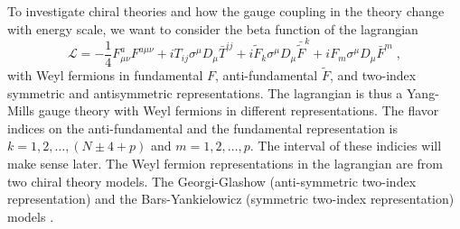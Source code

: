 To investigate chiral theories and how the gauge coupling in the theory change with energy scale, we want to consider the beta function of the lagrangian 
\begin{equation}
    \mathcal{L}=-\frac{1}{4} F^a_{\mu\nu}F^{a\mu\nu} + iT_{ij}\sigma^\mu D_\mu \bar T^{ij} + i\tilde{F}_k\sigma^\mu D_\mu \bar{\tilde{F}}^k+iF_m \sigma^\mu D_\mu \bar{F}^m\;, \label{eq:lagrangian YM Weyl}
\end{equation}
with Weyl fermions in fundamental $F$, anti-fundamental $\tilde{F}$, and two-index symmetric and antisymmetric representations. The lagrangian is thus a Yang-Mills gauge theory with Weyl fermions in different representations. The flavor indices on the anti-fundamental and the fundamental representation is $k=1,2,\ldots,(N\pm 4+p)$ and $m=1,2,\ldots,p$. The interval of these indicies will make sense later. The Weyl fermion representations in the lagrangian are from two chiral theory models. The Georgi-Glashow (anti-symmetric two-index representation) and the Bars-Yankielowicz (symmetric two-index representation) models \cite{M_lgaard_2017}. 

